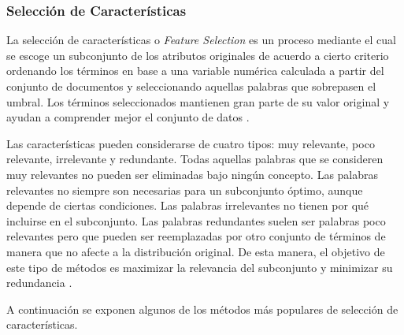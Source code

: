 \documentclass[10pt, a4paper]{article}
\begin{document}
\subsubsection{Selección de Características} \label{subsubsec:Selección de Características}

La selección de características o \textit{Feature Selection} es un proceso mediante el cual se escoge un subconjunto de los atributos originales de acuerdo a cierto criterio ordenando los términos en base a una variable numérica calculada a partir del conjunto de documentos y seleccionando aquellas palabras que sobrepasen el umbral. Los términos seleccionados mantienen gran parte de su valor original y ayudan a comprender mejor el conjunto de datos \cite{An Evaluation on Feature Selection for Text Clustering, Comparing and Combining Dimension Reduction Techniques for Efficient Text}. 

Las características pueden considerarse de cuatro tipos: muy relevante, poco relevante, irrelevante y redundante. Todas aquellas palabras que se consideren muy relevantes no pueden ser eliminadas bajo ningún concepto. Las palabras relevantes no siempre son necesarias para un subconjunto óptimo, aunque depende de ciertas condiciones. Las palabras irrelevantes no tienen por qué incluirse en el subconjunto. Las palabras redundantes suelen ser palabras poco relevantes pero que pueden ser reemplazadas por otro conjunto de términos de manera que no afecte a la distribución original. De esta manera, el objetivo de este tipo de métodos es maximizar la relevancia del subconjunto y minimizar su redundancia \cite{A review of feature selection methods with applications}.

A continuación se exponen algunos de los métodos más populares de selección de características.
\end{document}
